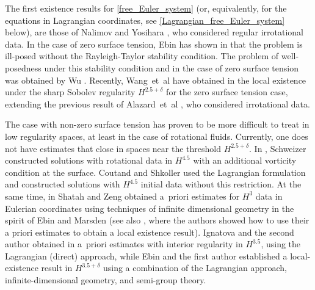 \documentclass[10pt,reqno]{amsart}
\theoremstyle{plain}
\theoremstyle{definition}
\numberwithin{equation}{section}
\newcommand{\de}{\delta}
\begin{document}
The first existence results for \eqref{free_Euler_system} 
(or,
equivalently, for the equations in Lagrangian coordinates, see
\eqref{Lagrangian_free_Euler_system} below), are those of
Nalimov 
\cite{NalimovCauchyPoisson}
and Yosihara
\cite{YosiharaGravity}, who considered regular irrotational data.
In the case of zero surface tension, Ebin has shown 
in  \cite{Ebin_ill-posed}
that the problem is ill-posed without the Rayleigh-Taylor
stability condition.
The problem of well-posedness under this stability condition and in
the case of zero surface tension was obtained by Wu
\cite{WuWaterWaves2d, 
WuWaterWaves}.
Recently, Wang~et~al have obtained in 
\cite{WZZZ} the local existence under the sharp Sobolev
regularity $H^{2.5+\delta}$ for the zero surface tension case,
extending the previous result of Alazard~et~al
\cite{AlazardSobolevEstimates}, who considered irrotational data.

The case with non-zero surface tension has proven to be more difficult
to 
treat in 
low regularity spaces, at least in the case of rotational fluids. Currently, one does not have estimates
that close in spaces near the threshold $H^{2.5+\delta}$.
In 
\cite{SchweizerFreeEuler},
Schweizer constructed solutions with rotational data in
$H^{4.5}$ with an additional vorticity condition at the surface.
Coutand and Shkoller \cite{CoutandShkollerFreeBoundary} used the Lagrangian formulation and
 constructed solutions with  
$H^{4.5}$ initial data without this restriction.
At the same time, in \cite{ShatahZengGeometry} Shatah and Zeng
obtained a~priori estimates for $H^{3}$ data in Eulerian coordinates
using techniques of infinite dimensional geometry in the spirit of
Ebin and Marsden \cite{EbinMarsden} (see also
\cite{ShatahZengInterface}, where the authors showed how to use their a priori estimates
to obtain a local existence result).
Ignatova and the second author obtained 
in \cite{IgorMihaelaSurfaceTension} 
a~priori estimates with interior regularity in $H^{3.5}$, using
the Lagrangian (direct) approach, while Ebin and the first author
established a local-existence result in $H^{3.5 + \de}$ using a combination
of the Lagrangian approach, infinite-dimensional geometry, and semi-group theory.
\end{document}
